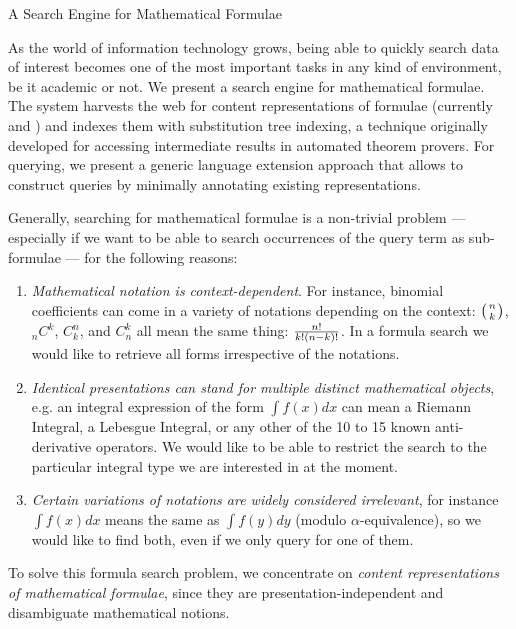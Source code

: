 
\begin{omgroup}[id=mathwebsearch,creators={isucan,miko}]{A Search Engine for Mathematical Formulae}

As the world of information technology grows, being able to quickly search data of
interest becomes one of the most important tasks in any kind of environment, be it
academic or not. We present a search engine for mathematical formulae. The {\mmlsearch}
system harvests the web for content representations of formulae (currently {\mathml} and
{\openmath}) and indexes them with substitution tree indexing, a technique originally
developed for accessing intermediate results in automated theorem provers. For querying,
we present a generic language extension approach that allows to construct queries by
minimally annotating existing representations.

Generally, searching for mathematical formulae is a non-trivial problem --- especially if
we want to be able to search occurrences of the query term as sub-formulae --- for the
following reasons:
\begin{enumerate}
\item {\emph{Mathematical notation is context-dependent}}. For instance, binomial
  coefficients can come in a variety of notations depending on the context: $\left(n\atop
    k\right)$, $_nC^k$, $C^n_k$, and $C^k_n$ all mean the same thing: $n!\over k!(n-k)!$.
  In a formula search we would like to retrieve all forms irrespective of the notations.
\item {\emph{Identical presentations can stand for multiple distinct mathematical
      objects}}, e.g. an integral expression of the form $\int f(x) dx$ can mean a Riemann
  Integral, a Lebesgue Integral, or any other of the 10 to 15 known anti-derivative
  operators.  We would like to be able to restrict the search to the particular integral
  type we are interested in at the moment.
\item {\emph{Certain variations of notations are widely considered irrelevant}}, for
  instance $\int f(x) dx$ means the same as $\int f(y) dy$ (modulo $\alpha$-equivalence),
  so we would like to find both, even if we only query for one of them.
\end{enumerate}
To solve this formula search problem, we concentrate on {\emph{content representations of
    mathematical formulae}}, since they are presentation-independent and disambiguate
mathematical notions.


\end{omgroup}
